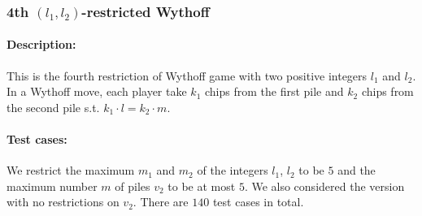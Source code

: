 \documentclass[review]{elsarticle}
\begin{document}

\subsubsection{4th $(l_1,l_2)$-restricted Wythoff \protect\cite{EriS2009}}

\paragraph{Description:}
This is the fourth restriction of Wythoff game with two positive integers $l_1$ and $l_2$.
In a Wythoff move, each player take $k_1$ chips from the first pile and $k_2$ chips from the second pile s.t. $ k_1 \cdot l = k_2 \cdot m$.


\paragraph{Test cases:}
We restrict the maximum $m_1$ and $m_2$ of the integers $l_1$, $l_2$ to be $5$ and the maximum number $m$ of piles $v_2$ to be at most $5$.
We also considered the version with no restrictions on $v_2$.
There are $140$ test cases in total.

\end{document}
